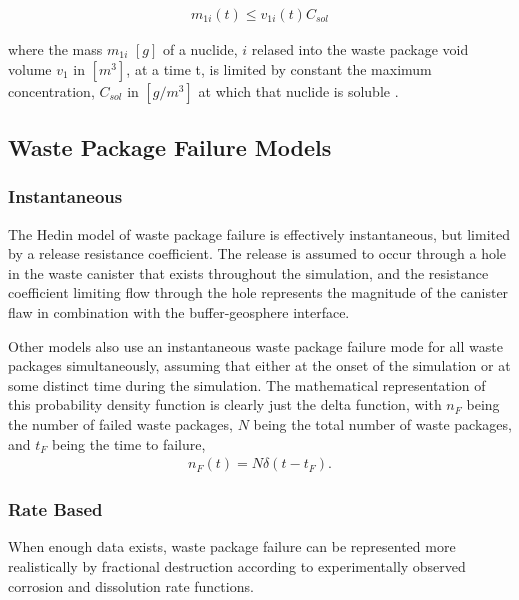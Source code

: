 {\begin{align*} m_{1i}(t)\le v_{1i}(t)C_{sol} \end{align*}

where the mass $m_{1i}$ $[g]$ of a nuclide, $i$ relased into the waste package
void volume $v_1$ in $[m^3]$, at a time t, is limited by constant the maximum
concentration, $C_{sol}$ in $[g/m^3]$ at which that nuclide is soluble 
\cite{hedin_integrated_2002}.


\subsection{Waste Package Failure Models}




\subsubsection{Instantaneous}
 
The Hedin model of waste package failure is effectively instantaneous, but
limited by a release resistance coefficient. The release is assumed  to occur
through a hole in the waste canister that exists throughout the simulation, and
the resistance coefficient limiting flow through the hole represents the
magnitude of the canister flaw in combination with the buffer-geosphere
interface\cite{hedin_integrated_2002}.

Other models also use an instantaneous waste package failure mode for all waste  
packages simultaneously, assuming that either at the onset of the simulation
or at some distinct time during the simulation. The mathematical representation of this 
probability density function is clearly just the delta function, with $n_F$ 
being the number of failed waste packages, $N$ being the total number of waste 
packages, and $t_F$ being the time to failure,
\begin{align}
  n_F(t) = N\delta(t-t_F).
  \label{instantaneous}
\end{align}

\subsubsection{Rate Based} 

When enough data exists, waste package failure can
be represented more  realistically by fractional destruction according to
experimentally observed corrosion and dissolution rate functions.

}

